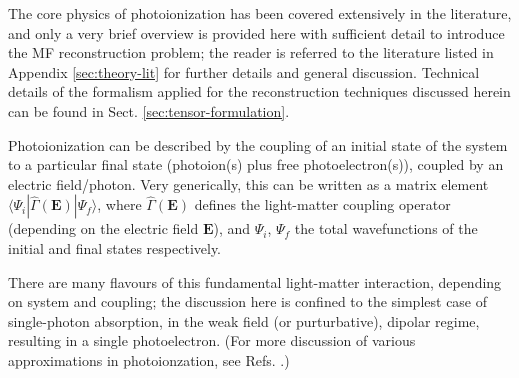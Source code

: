 \documentclass[10pt]{article}
\begin{document}


The core physics of photoionization has been covered extensively in the literature, and only a very brief overview is provided here with sufficient detail to introduce the MF reconstruction problem; the reader is referred to the literature listed in Appendix \ref{sec:theory-lit} for further details and general discussion. Technical details of the formalism applied for the reconstruction techniques discussed herein can be found in Sect. \ref{sec:tensor-formulation}.

Photoionization can be described by the coupling of an initial state of the system to a particular final state (photoion(s) plus free photoelectron(s)), coupled by an electric field/photon. Very generically, this can be written as a matrix element $\langle\Psi_i|\hat{\Gamma}(\boldsymbol{\mathbf{E}})|\Psi_f\rangle$, where $\hat{\Gamma}(\boldsymbol{\mathbf{E}})$ defines the light-matter coupling operator (depending on the electric field $\boldsymbol{\mathbf{E}}$), and $\Psi_i$, $\Psi_f$ the total wavefunctions of the initial and final states respectively. 

There are many flavours of this fundamental light-matter interaction, depending on system and coupling; the discussion here is confined to the simplest case of single-photon absorption, in the weak field (or purturbative), dipolar regime, resulting in a single photoelectron. (For more discussion of various approximations in photoionzation, see Refs. \cite{Seideman2002,Seideman2001}.)

\end{document}
